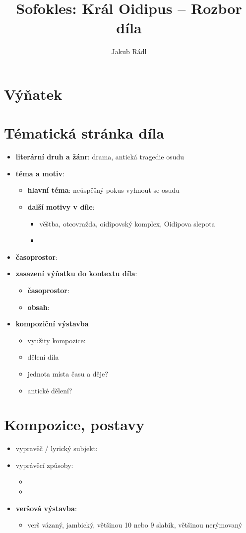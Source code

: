 \documentclass[10pt,a4paper]{article}
\date{}
\author{Jakub Rádl}
\title{Sofokles: Král Oidipus -- Rozbor díla}
\begin{document}
\maketitle

\section*{Výňatek}

\section*{Tématická stránka díla}
\begin{itemize}
\item \textbf{literární druh a žánr}: drama, antická tragedie osudu
\item \textbf{téma a motiv}:
	\begin{itemize}
	\item \textbf{hlavní téma}: neúspěšný pokus vyhnout se osudu
	\item \textbf{další motivy v díle}:
		\begin{itemize}
		\item věštba, otcovražda, oidipovský komplex, Oidipova slepota
		\item 
		\end{itemize}
	\end{itemize}
\item \textbf{časoprostor}:
\item \textbf{zasazení výňatku do kontextu díla}:
	\begin{itemize}
	\item \textbf{časoprostor}:
	\item \textbf{obsah}: 
	\end{itemize}
\item \textbf{kompoziční výstavba}
	\begin{itemize}
	\item využity kompozice: 
	\item dělení díla
	\item jednota místa času a děje?
	\item antické dělení?
	\end{itemize}
\end{itemize}
\section*{Kompozice, postavy}
\begin{itemize}
\item vypravěč / lyrický subjekt:
\item vyprávěcí způsoby:
	\begin{itemize}
	\item 
	\item
	\end{itemize}
\item \textbf{veršová výstavba}:	
	\begin{itemize}
	\item verš vázaný, jambický, většinou 10 nebo 9 slabik, většinou nerýmovaný
	\end{itemize}
\end{itemize}
\end{document}
